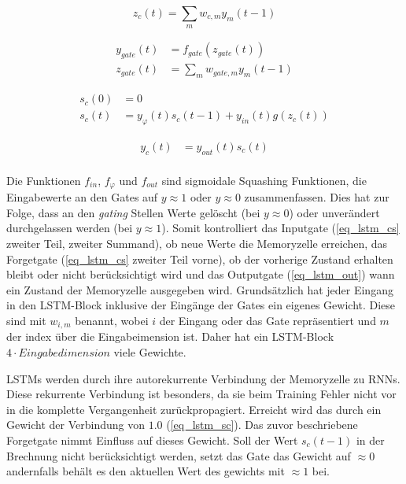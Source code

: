 \begin{equation}
\label{eq_lstm_in}
z_{c}(t) = \sum \limits_{m} w_{c,m}y_m(t-1)
\end{equation}

\begin{equation}
\label{eq_lstm_gate}
\begin{split}
y_{gate}(t) &= f_{gate}(z_{gate}(t))\\
z_{gate}(t) &= \sum \limits_{m} w_{gate,m}y_m(t-1)
\end{split}
\end{equation}

\begin{equation}
\label{eq_lstm_cs}
\begin{split}
s_{c}(0) &= 0\\
s_{c}(t) &= y_{\varphi}(t)s_{c}(t-1) +
y_{in}(t)g(z_{c}(t))
\end{split}
\end{equation}

\begin{equation}
\label{eq_lstm_out}
\begin{split}
y_{c}(t) &= y_{out}(t)s_{c}(t)\\
\end{split}
\end{equation}

Die Funktionen $f_{in}$, $f_{\varphi}$ und $f_{out}$ sind sigmoidale Squashing
Funktionen, die Eingabewerte an den Gates auf $y\approx1$ oder $y\approx0$
zusammenfassen. Dies hat zur Folge, dass an den \textit{gating} Stellen Werte
gelöscht (bei $y\approx0$) oder unverändert durchgelassen werden (bei
$y\approx1$). Somit kontrolliert das Inputgate (\autoref{eq_lstm_cs} zweiter
Teil, zweiter Summand), ob neue Werte die Memoryzelle erreichen, das Forgetgate
(\autoref{eq_lstm_cs} zweiter Teil vorne), ob der vorherige Zustand erhalten
bleibt oder nicht berücksichtigt wird und das Outputgate (\autoref{eq_lstm_out})
wann ein Zustand der Memoryzelle ausgegeben wird. Grundsätzlich hat jeder
Eingang in den \ac{LSTM}-Block inklusive der Eingänge der Gates ein eigenes
Gewicht. Diese sind mit $w_{i,m}$ benannt, wobei $i$ der Eingang oder das Gate
repräsentiert und $m$ der index über die Eingabeimension ist. Daher hat ein
\ac{LSTM}-Block $4\cdot Eingabedimension$ viele Gewichte. 

\acp{LSTM} werden durch ihre autorekurrente Verbindung der Memoryzelle zu
\acp{RNN}. Diese rekurrente Verbindung ist besonders, da sie beim Training
Fehler nicht vor in die komplette Vergangenheit zurückpropagiert. Erreicht wird
das durch ein Gewicht der Verbindung von $1.0$ (\autoref{eq_lstm_sc}). Das zuvor
beschriebene Forgetgate nimmt Einfluss auf dieses Gewicht. Soll der Wert
$s_c(t-1)$ in der Brechnung nicht berücksichtigt werden, setzt das Gate das
Gewicht auf $\approx0$ andernfalls behält es den aktuellen Wert des gewichts mit
$\approx1$ bei. 

